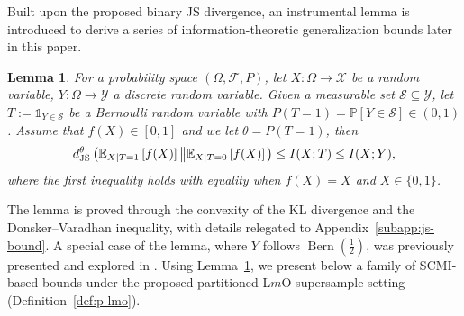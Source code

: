 \documentclass[onecolumn,romanappendices,10pt]{IEEEtran}
\newtheorem{lemma}{Lemma}
\newcommand{\Fcal}{{\mathcal F}}
\newcommand{\Xcal}{{\mathcal X}}
\newcommand{\Ycal}{{\mathcal Y}}
\newcommand{\Scal}{{\mathcal S}}
\newcommand{\EE}{{\mathbb{E}}}
\newcommand{\PP}{{\mathbb{P}}}
\DeclareMathOperator{\Bernoulli}{Bern}
\begin{document}
	Built upon the proposed binary JS divergence, an instrumental lemma is introduced to derive a series of information-theoretic generalization bounds later in this paper. 
	
	\begin{lemma}\label{lem:js-bound}
		For a probability space $(\Omega, \Fcal, P)$, let $X : \Omega \to \Xcal$ be a random variable, $Y: \Omega \to \Ycal$ a discrete random variable. Given a measurable set $\Scal \subseteq \Ycal$, let $T := \mathds{1}_{Y \in \Scal}$ be a Bernoulli random variable with $P(T = 1)  = \PP[Y \in \Scal] \in (0, 1)$. Assume that $f(X) \in [0, 1]$ and we let $\theta = P(T = 1)$, then
		\begin{align}
			d^\theta_{\textnormal{JS}} \left( \EE_{X|T=1} \left[ f(X) \right] \left\| \EE_{X|T=0} \left[ f(X) \right] \right. \right) \leq I(X; T) \leq I(X; Y),
		\end{align}
		where the first inequality holds with equality when $f(X) = X$ and $X \in \{0, 1\}$.
	\end{lemma}
	
	The lemma is proved through the convexity of the KL divergence and the Donsker–Varadhan inequality, with details relegated to Appendix~\ref{subapp:js-bound}. A special case of the lemma, where $Y$ follows $\Bernoulli(\frac{1}{2})$, was previously presented and explored in \cite{dongexactly}. Using Lemma~\ref{lem:js-bound}, we present below a family of SCMI-based bounds under the proposed partitioned L$m$O supersample setting (Definition~\ref{def:p-lmo}).
	
\end{document}
